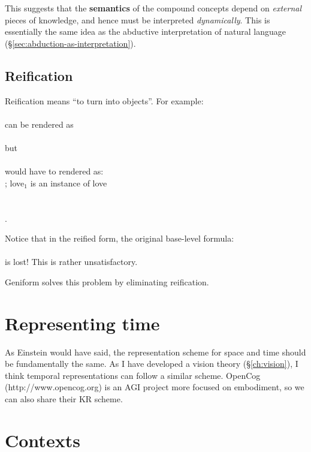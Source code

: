 This suggests that the \textbf{semantics} of the compound concepts depend on \textit{external} pieces of knowledge, and hence must be interpreted \textit{dynamically}.  This is essentially the same idea as the abductive interpretation of natural language (\S\ref{sec:abduction-as-interpretation}).

\subsection{Reification}
\label{sec:reification}

Reification means ``to turn into objects''.  For example:\\
\tab {}\\
can be rendered as\\
\tab {}\\
but\\
\tab {}\\
would have to rendered as:\\
\tab {} \tab \tab ; love$_1$ is an instance of love\\
\tab {}\\
\tab {}\\
\tab {}.

Notice that in the reified form, the original base-level formula:\\
\tab {}\\
is lost!  This is rather unsatisfactory.

Geniform solves this problem by eliminating reification.

\section{Representing time}

As Einstein would have said, the representation scheme for space and time should be fundamentally the same.  As I have developed a vision theory (\S\ref{ch:vision}), I think temporal representations can follow a similar scheme.  OpenCog (http://www.opencog.org) is an AGI project more focused on embodiment, so we can also share their KR scheme.

\section{Contexts}

